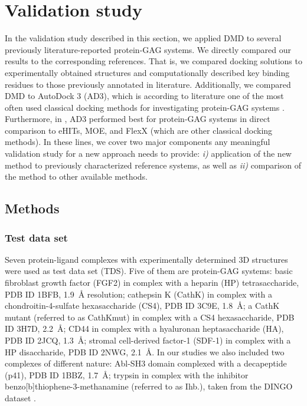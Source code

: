 \section{Validation study}

In the validation study described in this section, we applied DMD to several
previously literature-reported protein-GAG systems. We directly compared our
results to the corresponding references. That is, we compared docking solutions
to experimentally obtained structures and computationally described key binding
residues to those previously annotated in literature. Additionally, we compared
DMD to AutoDock 3 (AD3), which is according to literature one of the most often
used classical docking methods for investigating protein-GAG systems
\cite{japan_docking_ad3_clustering,pichert_characterization_2012,%
imberty_perez_protgag_comp_book_2006,franz_cathepsin_2013}. Furthermore, in
\cite{samsonov_docking_2011}, AD3 performed best for protein-GAG systems in
direct comparison to eHITs, MOE, and FlexX (which are other classical docking
methods). In these lines, we cover two major components any meaningful
validation study for a new approach needs to provide: \textit{i)} application of
the new method to previously characterized reference systems, as well as
\textit{ii)} comparison of the method to other available methods.

\subsection{Methods}
\subsubsection{Test data set}

Seven protein-ligand complexes with experimentally determined 3D structures were
used as test data set (TDS). Five of them are protein-GAG systems: basic
fibroblast growth factor (FGF2) in complex with a heparin (HP) tetrasaccharide,
PDB ID 1BFB, \SI{1.9}{\angstrom} resolution; cathepsin K (CathK) in complex with
a chondroitin-4-sulfate hexasaccharide (CS4), PDB ID 3C9E, \SI{1.8}{\angstrom};
a CathK mutant (referred to as CathKmut) in complex with a CS4 hexasaccharide,
PDB ID 3H7D, \SI{2.2}{\angstrom}; CD44 in complex with a hyaluronan
heptasaccharide (HA), PDB ID 2JCQ, \SI{1.3}{\angstrom}; stromal cell-derived
factor-1 (SDF-1) in complex with a HP disaccharide, PDB ID 2NWG,
\SI{2.1}{\angstrom}. In our studies we also included two complexes of different
nature: Abl-SH3 domain complexed with a decapeptide (p41), PDB ID 1BBZ,
\SI{1.7}{\angstrom}; trypsin in complex with the inhibitor
benzo[b]thiophene-3-methanamine (referred to as Ihb.), taken from the DINGO
dataset \cite{newman_dingo_2012}.

